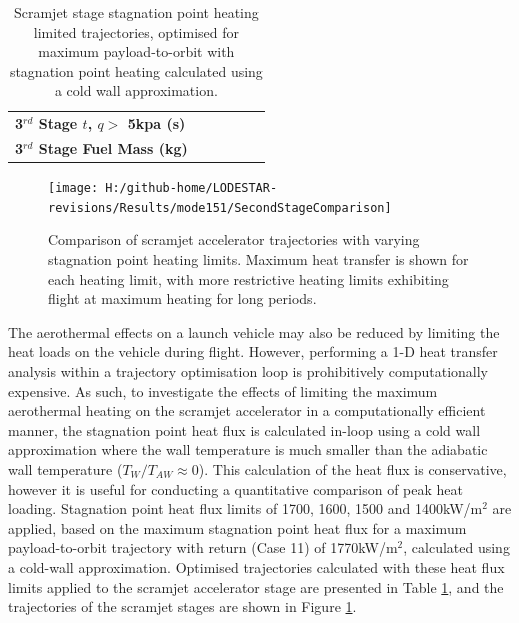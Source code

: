 \begin{table}[ht]
\begin{tabular}{l c c c c c }
		\textbf{3$^{rd}$ Stage $t$, $q >$ 5kpa (s)}
		& \thirdqOverFiveheatLimStandard
		& \thirdqOverFiveheatLimSeventeenHundred
		& \thirdqOverFiveheatLimSixteenHundred
		& \thirdqOverFiveheatLimFifteenHundred
		& \thirdqOverFiveheatLimFourteenHundred
		\\
		\textbf{3$^{rd}$ Stage Fuel Mass (kg)}
		& \thirdmFuelheatLimStandard
		& \thirdmFuelheatLimSeventeenHundred
		& \thirdmFuelheatLimSixteenHundred
		& \thirdmFuelheatLimFifteenHundred
		& \thirdmFuelheatLimFourteenHundred
		\\
		\hline 
	\end{tabular} 
	\caption{Scramjet stage stagnation point heating limited trajectories, optimised for maximum payload-to-orbit with stagnation point heating calculated using a cold wall approximation. }
	\label{tab:stagLim}
\end{table}
\begin{figure}[!ht]
	\centering
	\texttt{[image: H:/github-home/LODESTAR-revisions/Results/mode151/SecondStageComparison]}
	\caption{Comparison of scramjet accelerator trajectories with varying stagnation point heating limits. Maximum heat transfer is shown for each heating limit, with more restrictive heating limits exhibiting flight at maximum heating for long periods. }
	\label{fig:SecondStageheatlimComparison}
\end{figure}

\noindent
The aerothermal effects on a launch vehicle may also be reduced by limiting the heat loads on the vehicle during flight. However, performing a 1-D heat transfer analysis within a trajectory optimisation loop is prohibitively computationally expensive. 
As such, to investigate the effects of limiting the maximum aerothermal heating on the scramjet accelerator in a computationally efficient manner, the stagnation point heat flux is calculated in-loop using a cold wall approximation where the wall temperature is much smaller than the adiabatic wall temperature ($T_W/T_{AW} \approx 0$)\cite{Dirkx}. This calculation of the heat flux is conservative, however it is useful for conducting a quantitative comparison of peak heat loading. Stagnation point heat flux limits of 1700, 1600, 1500 and 1400kW/m$^2$ are applied, based on the maximum stagnation point heat flux for a maximum payload-to-orbit trajectory with return (Case 11) of 1770kW/m$^2$, calculated using a cold-wall approximation. Optimised trajectories calculated with these heat flux limits applied to the scramjet accelerator stage are presented in Table \ref{tab:stagLim}, and the trajectories of the scramjet stages are shown in Figure \ref{fig:SecondStageheatlimComparison}. 

